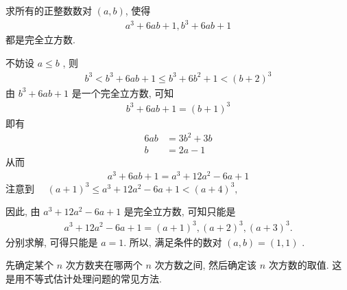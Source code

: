 \begin{example}
	求所有的正整数数对 $(a, b)$, 使得
	\begin{align*}
		a^{3}+6 a b+1, b^{3}+6 a b+1
	\end{align*}
	都是完全立方数.
\end{example}
\begin{solution}
	不妨设 $a \leqslant b$ , 则
	\begin{align*}
		b^{3}<b^{3}+6 a b+1 \leqslant b^{3}+6 b^{2}+1<(b+2)^{3}
	\end{align*}
	由 $b^{3}+6 a b+1$ 是一个完全立方数, 可知
	\begin{align*}
		b^{3}+6 a b+1=(b+1)^{3}
	\end{align*}
	即有
	\begin{align}
		6 a b & =3 b^{2}+3 b \\
		b     & =2 a-1
	\end{align}
	从而
	\begin{align*}
		a^{3}+6 a b+1=a^{3}+12 a^{2}-6 a+1
	\end{align*}
	注意到 $\quad(a+1)^{3} \leqslant a^{3}+12 a^{2}-6 a+1<(a+4)^{3} , $

	因此, 由 $a^{3}+12 a^{2}-6 a+1$ 是完全立方数, 可知只能是
	\begin{align*}
		a^{3}+12 a^{2}-6 a+1=(a+1)^{3},(a+2)^{3},(a+3)^{3} .
	\end{align*}
	分别求解, 可得只能是 $a=1$.
	所以, 满足条件的数对 $(a, b)=(1,1)$ .
\end{solution}
\begin{note}
	先确定某个 $n$ 次方数夹在哪两个 $n$ 次方数之间, 然后确定该 $n$ 次方数的取值. 这是用不等式估计处理问题的常见方法.
\end{note}

